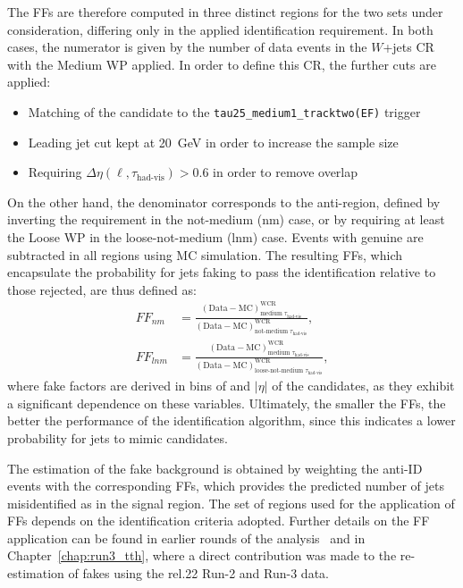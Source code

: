 The FFs are therefore computed in three distinct regions for the two sets under consideration, differing only in the applied identification requirement. 
In both cases, the numerator is given by the number of data events in the $W$+jets CR with the Medium WP applied. In order to define this CR, the further cuts are applied:
\begin{itemize}
  \small
  \item Matching of the \tauhadvis candidate to the \texttt{tau25\_medium1\_tracktwo(EF)} trigger
  \item Leading jet \pt cut kept at 20~GeV in order to increase the sample size
  \item Requiring $\Delta\eta(\ell,\tau_{\text{had-vis}}) > 0.6$ in order to remove overlap
\end{itemize}
On the other hand, the denominator corresponds to the anti-\tauhadvis region, defined by inverting the requirement in the not-medium (nm) case, or by requiring at least the Loose WP in the loose-not-medium (lnm) case. 
Events with genuine \tauhadvis are subtracted in all regions using MC simulation. 
The resulting FFs, which encapsulate the probability for jets faking \tauhadvis to pass the identification relative to those rejected, are thus defined as:
\begin{align}
    FF_{nm} &= 
    \frac{(\text{Data} - \text{MC})^{\text{WCR}}_{\text{medium } \tau_{\text{had-vis}}}}
         {(\text{Data} - \text{MC})^{\text{WCR}}_{\text{not-medium } \tau_{\text{had-vis}}}}, \nonumber \\[6pt]
    FF_{lnm} &= 
    \frac{(\text{Data} - \text{MC})^{\text{WCR}}_{\text{medium } \tau_{\text{had-vis}}}}
         {(\text{Data} - \text{MC})^{\text{WCR}}_{\text{loose-not-medium } \tau_{\text{had-vis}}}},
\label{eq_fakes}
\end{align}
where fake factors are derived in bins of \pt and $|\eta|$ of the \tauhadvis candidates, as they exhibit a significant dependence on these variables. 
Ultimately, the smaller the FFs, the better the performance of the \tauhad identification algorithm, since this indicates a lower probability for jets to mimic \tauhadvis candidates.

The estimation of the fake background is obtained by weighting the \tauhadhad anti-ID events with the corresponding FFs, which provides the predicted number of jets misidentified as \tauhadvis in the signal region. 
The set of regions used for the application of FFs depends on the identification criteria adopted. 
Further details on the FF application can be found in earlier rounds of the \Htautau analysis~\cite{couplings} and in Chapter~\ref{chap:run3_tth}, where a direct contribution was made to the re-estimation of fakes using the rel.22 Run-2 and Run-3 data.

